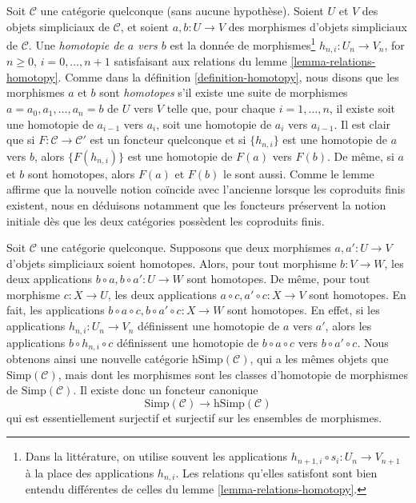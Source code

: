 \begin{remark}
\label{remark-homotopy-better}
Soit $\mathcal{C}$ une catégorie quelconque (sans aucune hypothèse).
Soient $U$ et $V$ des objets simpliciaux de $\mathcal{C}$, et soient
$a, b : U \to V$ des morphismes d'objets simpliciaux de $\mathcal{C}$.
Une {\it homotopie de $a$ vers $b$} est la donnée de
morphismes\footnote{Dans la littérature, on utilise souvent les applications
$h_{n + 1, i} \circ s_i : U_n \to V_{n + 1}$ à la place des
applications $h_{n, i}$. Les relations qu'elles satisfont sont bien entendu
différentes de celles du lemme \ref{lemma-relations-homotopy}.}
$h_{n, i} : U_n \to V_n$, for $n \geq 0$, $i = 0, \ldots, n + 1$
satisfaisant aux relations du lemme \ref{lemma-relations-homotopy}.
Comme dans la définition \ref{definition-homotopy}, nous disons que les
morphismes $a$ et $b$ sont {\it homotopes} s'il existe une suite de morphismes
$a = a_0, a_1, \ldots, a_n = b$ de $U$ vers $V$ telle que, pour chaque
$i = 1, \ldots, n$, il existe soit une homotopie de $a_{i - 1}$ vers $a_i$,
soit une homotopie de $a_i$ vers $a_{i - 1}$.
Il est clair que si $F : \mathcal{C} \to \mathcal{C}'$ est un foncteur
quelconque et si $\{h_{n, i}\}$ est une homotopie de $a$ vers $b$, alors
$\{F(h_{n, i})\}$ est une homotopie de $F(a)$ vers $F(b)$.
De même, si $a$ et $b$ sont homotopes, alors $F(a)$ et $F(b)$
le sont aussi.
Comme le lemme affirme que la nouvelle notion coïncide avec l'ancienne
lorsque les coproduits finis existent, nous en déduisons notamment que les
foncteurs préservent la notion initiale dès que les deux catégories possèdent
les coproduits finis.
\end{remark}

\begin{remark}
\label{remark-homotopy-pre-post-compose}
Soit $\mathcal{C}$ une catégorie quelconque. Supposons que deux morphismes
$a, a' : U \to V$ d'objets simpliciaux soient homotopes. Alors, pour tout
morphisme $b : V \to W$, les deux applications
$b \circ a, b \circ a' : U \to W$ sont homotopes.
De même, pour tout morphisme $c : X \to U$, les deux applications
$a \circ c, a' \circ c : X \to V$ sont homotopes. En fait, les applications
$b \circ a \circ c, b \circ a' \circ c : X \to W$ sont homotopes.
En effet, si les applications $h_{n, i} : U_n \to V_n$ définissent une
homotopie de $a$ vers $a'$, alors les applications
$b \circ h_{n, i} \circ c$ définissent une homotopie de
$b \circ a \circ c$ vers $b \circ a' \circ c$. Nous obtenons ainsi une
nouvelle catégorie $\text{hSimp}(\mathcal{C})$, qui a les mêmes objets que
$\text{Simp}(\mathcal{C})$, mais dont les morphismes sont les classes
d'homotopie de morphismes de $\text{Simp}(\mathcal{C})$.
Il existe donc un foncteur canonique
$$
\text{Simp}(\mathcal{C})
\longrightarrow
\text{hSimp}(\mathcal{C})
$$
qui est essentiellement surjectif et surjectif sur les ensembles de morphismes.
\end{remark}

